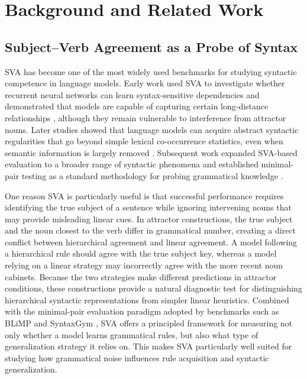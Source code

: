 \section{Background and Related Work}
\label{sec:background}

\subsection{Subject--Verb Agreement as a Probe of Syntax}

SVA has become one of the most widely used benchmarks for studying syntactic competence in language models. Early work used SVA to investigate whether recurrent neural networks can learn syntax-sensitive dependencies and demonstrated that models are capable of capturing certain long-distance relationships \citep{linzen2016}, although they remain vulnerable to interference from attractor nouns. Later studies showed that language models can acquire abstract syntactic regularities that go beyond simple lexical co-occurrence statistics, even when semantic information is largely removed \citep{gulordava2018}. Subsequent work expanded SVA-based evaluation to a broader range of syntactic phenomena and established minimal-pair testing as a standard methodology for probing grammatical knowledge \citep{marvin2018}.

One reason SVA is particularly useful is that successful performance requires identifying the true subject of a sentence while ignoring intervening nouns that may provide misleading linear cues. In attractor constructions, the true subject and the noun closest to the verb differ in grammatical number, creating a direct conflict between hierarchical agreement and linear agreement. A model following a hierarchical rule should agree with the true subject key, whereas a model relying on a linear strategy may incorrectly agree with the more recent noun cabinets. Because the two strategies make different predictions in attractor conditions, these constructions provide a natural diagnostic test for distinguishing hierarchical syntactic representations from simpler linear heuristics. Combined with the minimal-pair evaluation paradigm adopted by benchmarks such as BLiMP and SyntaxGym \citep{warstadt2020, gauthier2020}, SVA offers a principled framework for measuring not only whether a model learns grammatical rules, but also what type of generalization strategy it relies on. This makes SVA particularly well suited for studying how grammatical noise influences rule acquisition and syntactic generalization.


